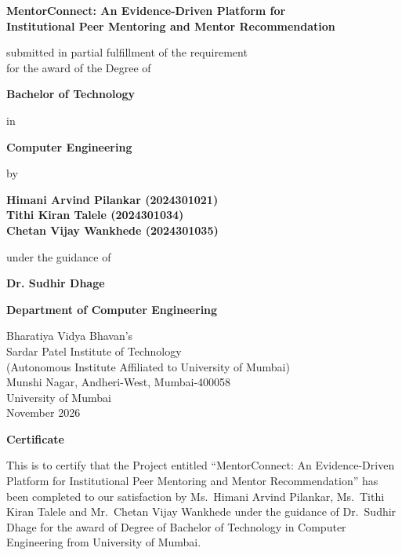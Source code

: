 \documentclass[12pt,a4paper]{report}
\begin{document}
\begin{titlepage}
\centering
\vspace*{1.2cm}
{\LARGE\bfseries MentorConnect: An Evidence-Driven Platform for\\[4pt] Institutional Peer Mentoring and Mentor Recommendation\par}
\vspace{1.4cm}
{\large submitted in partial fulfillment of the requirement\\ for the award of the Degree of\par}
\vspace{1.2cm}
{\large\bfseries Bachelor of Technology\par}
{\large in\par}
{\large\bfseries Computer Engineering\par}
\vspace{1.2cm}
{\large by\par}
\vspace{0.6cm}
{\large\bfseries Himani Arvind Pilankar (2024301021)\\ Tithi Kiran Talele (2024301034)\\ Chetan Vijay Wankhede (2024301035)\par}
\vspace{1.2cm}
{\large under the guidance of\par}
\vspace{0.4cm}
{\large\bfseries Dr. Sudhir Dhage\par}
\vfill
{\large\bfseries Department of Computer Engineering\par}
{\large Bharatiya Vidya Bhavan's\\ Sardar Patel Institute of Technology\\ (Autonomous Institute Affiliated to University of Mumbai)\\ Munshi Nagar, Andheri-West, Mumbai-400058\\ University of Mumbai\\ November 2026\par}
\end{titlepage}

\thispagestyle{empty}
\begin{center}
\vspace*{1cm}
{\Large\bfseries Certificate\par}
\end{center}
\vspace{1cm}
\noindent This is to certify that the Project entitled ``MentorConnect: An Evidence-Driven Platform for Institutional Peer Mentoring and Mentor Recommendation'' has been completed to our satisfaction by Ms.\ Himani Arvind Pilankar, Ms.\ Tithi Kiran Talele and Mr.\ Chetan Vijay Wankhede under the guidance of Dr.\ Sudhir Dhage for the award of Degree of Bachelor of Technology in Computer Engineering from University of Mumbai.
\end{document}
